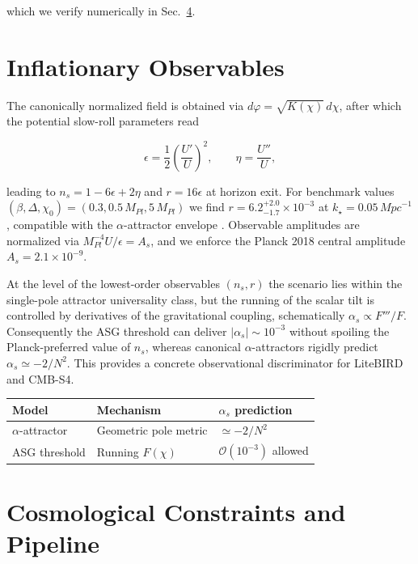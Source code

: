 \documentclass[
]{article}
\newcounter{none} %
\begin{document}
which we verify numerically in
Sec.~\hyperref[sec:inflationary-observables]{4}.

\section{Inflationary Observables}\label{inflationary-observables}

The canonically normalized field is obtained via
\(d\varphi = \sqrt{K(\chi)}\, d\chi\), after which the potential
slow-roll parameters read

\[
\epsilon = \frac{1}{2}\left( \frac{U'}{U} \right)^{2},\quad\quad\eta = \frac{U''}{U},
\]

leading to \(n_{s} = 1 - 6\epsilon + 2\eta\) and \(r = 16\epsilon\) at
horizon exit. For benchmark values
\((\beta,\Delta,\chi_{0}) = (0.3,0.5\, M_{Pl},5\, M_{Pl})\) we find
\(r = {6.2}_{- 1.7}^{+ 2.0} \times 10^{- 3}\) at
\(k_{\star} = 0.05\,{Mpc}^{- 1}\), compatible with the
\(\alpha\)-attractor envelope . Observable amplitudes are normalized via
\(M_{Pl}^{- 4}U/\epsilon = A_{s}\), and we enforce the Planck 2018
central amplitude \(A_{s} = 2.1 \times 10^{- 9}\).

At the level of the lowest-order observables \((n_{s},r)\) the scenario
lies within the single-pole attractor universality class, but the
running of the scalar tilt is controlled by derivatives of the
gravitational coupling, schematically \(\alpha_{s} \propto F'''/F\).
Consequently the ASG threshold can deliver
\(|\alpha_{s}| \sim 10^{- 3}\) without spoiling the Planck-preferred
value of \(n_{s}\), whereas canonical \(\alpha\)-attractors rigidly
predict \(\alpha_{s} \simeq - 2/N^{2}\). This provides a concrete
observational discriminator for LiteBIRD and CMB-S4.

{\def\LTcaptype{none} %
\begin{longtable}[]{@{}lll@{}}
\toprule\noalign{}
Model & Mechanism & \(\alpha_{s}\) prediction \\
\midrule\noalign{}
\endhead
\bottomrule\noalign{}
\endlastfoot
\(\alpha\)-attractor & Geometric pole metric & \(\simeq - 2/N^{2}\) \\
ASG threshold & Running \(F(\chi)\) & \(\mathcal{O}(10^{- 3})\)
allowed \\
\end{longtable}
}

\section{Cosmological Constraints and
Pipeline}\label{cosmological-constraints-and-pipeline}
\end{document}
